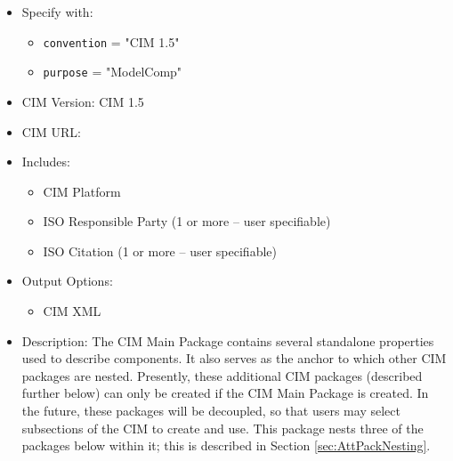 \begin{itemize}
    \item Specify with:
    \begin{itemize}
        \item {\tt convention} = "CIM 1.5"
        \item {\tt purpose} = "ModelComp"
    \end{itemize}
    \item CIM Version: CIM 1.5
    \item CIM URL: 
    \item Includes:
    \begin{itemize}
       \item CIM Platform
       \item ISO Responsible Party (1 or more -- user specifiable)
       \item ISO Citation (1 or more -- user specifiable)
    \end{itemize}
    \item Output Options: 
    \begin{itemize}
        \item CIM XML
    \end{itemize}  
    \item Description: The CIM Main Package contains several standalone properties used to describe components. It also serves as the anchor to which other CIM packages are nested. Presently, these additional CIM packages (described further below) can only be created if the CIM Main Package is created. In the future, these packages will be decoupled, so that users may select subsections of the CIM to create and use. This package nests three of the packages below within it; this is described in Section \ref{sec:AttPackNesting}.
\end{itemize}


